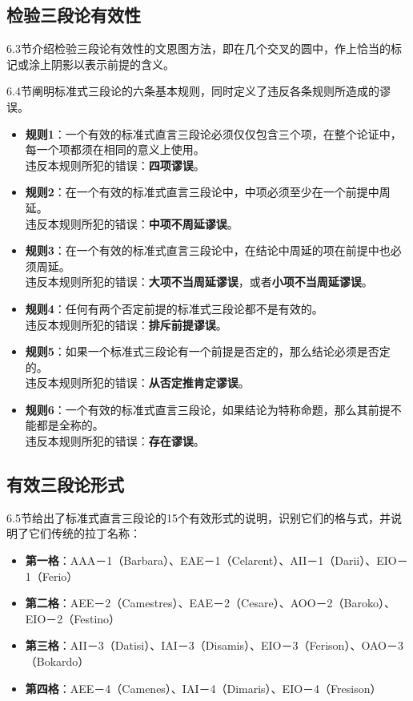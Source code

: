 \subsection{检验三段论有效性}
6.3节介绍检验三段论有效性的文恩图方法，即在几个交叉的圆中，作上恰当的标记或涂上阴影以表示前提的含义。

6.4节阐明标准式三段论的六条基本规则，同时定义了违反各条规则所造成的谬误。

\begin{itemize}
\item \textbf{规则1}：一个有效的标准式直言三段论必须仅仅包含三个项，在整个论证中，每一个项都须在相同的意义上使用。\\
违反本规则所犯的错误：\textbf{四项谬误}。

\item \textbf{规则2}：在一个有效的标准式直言三段论中，中项必须至少在一个前提中周延。\\
违反本规则所犯的错误：\textbf{中项不周延谬误}。

\item \textbf{规则3}：在一个有效的标准式直言三段论中，在结论中周延的项在前提中也必须周延。\\
违反本规则所犯的错误：\textbf{大项不当周延谬误}，或者\textbf{小项不当周延谬误}。

\item \textbf{规则4}：任何有两个否定前提的标准式三段论都不是有效的。\\
违反本规则所犯的错误：\textbf{排斥前提谬误}。

\item \textbf{规则5}：如果一个标准式三段论有一个前提是否定的，那么结论必须是否定的。\\
违反本规则所犯的错误：\textbf{从否定推肯定谬误}。

\item \textbf{规则6}：一个有效的标准式直言三段论，如果结论为特称命题，那么其前提不能都是全称的。\\
违反本规则所犯的错误：\textbf{存在谬误}。
\end{itemize}

\subsection{有效三段论形式}
6.5节给出了标准式直言三段论的15个有效形式的说明，识别它们的格与式，并说明了它们传统的拉丁名称：

\begin{itemize}
\item \textbf{第一格}：AAA－1（Barbara）、EAE－1（Celarent）、AII－1（Darii）、EIO－1（Ferio）
\item \textbf{第二格}：AEE－2（Camestres）、EAE－2（Cesare）、AOO－2（Baroko）、EIO－2（Festino）
\item \textbf{第三格}：AII－3（Datisi）、IAI－3（Disamis）、EIO－3（Ferison）、OAO－3（Bokardo）
\item \textbf{第四格}：AEE－4（Camenes）、IAI－4（Dimaris）、EIO－4（Fresison）
\end{itemize}

